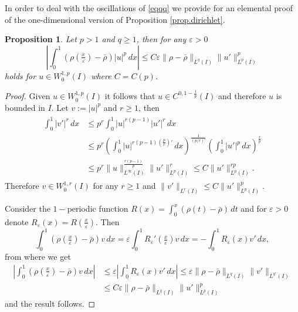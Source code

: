 \documentclass[12pt]{amsart}
\newtheorem{prop}[thm]{Proposition}
\theoremstyle{definition}
\theoremstyle{remark}
\numberwithin{equation}{section}
\begin{document}
 

In order to deal with the oscillations of \eqref{eqqq} we provide for an elemental proof of the one-dimensional version of Proposition \ref{prop.dirichlet}.

\begin{prop} \label{prop1d}
Let $p>1$ and $q\geq 1$, then for any $\varepsilon>0$ 
$$
\left|\int_0^1 (\rho(\tfrac{x}{\varepsilon})-\bar\rho) |u|^p\,dx \right| \leq C \varepsilon \|\rho-\bar \rho\|_{L^q(I)} \|u'\|_{L^{p}(I)}^p
$$
holds for $u\in W^{1,p}_0(I)$ where $C=C(p)$.
\end{prop}

\begin{proof}
Given $u\in W^{1,p}_0(I)$ it follows that $u\in C^{0,1-\frac1p}(I)$ and therefore $u$ is bounded in $I$. Let $v:=|u|^p$ and  $r\geq 1$, then
\begin{align*} 
\begin{split}
\int_0^1 |v'|^r\,dx &\leq p^r \int_0^1 |u|^{r(p-1)} |u'|^r\,dx\\
&\leq p^r \left(\int_0^1 |u|^{r(p-1)(\frac{p}{r})' }\,dx \right)^{\frac{1}{(p/r)'}} \left(\int_0^1 |u'|^p\,dx \right)^\frac{r}{p}\\
&\leq p^r \|u\|_{L^\infty(I)}^\frac{r(p-1)}{p} \|u'\|_{L^p(I)}^r \leq C \|u'\|_{L^p(I)}^{rp}.
\end{split}
\end{align*}
Therefore $v\in W^{1,r}_0(I)$ for any $r\geq 1$ and $\|v'\|_{L^r(I)}\leq C \|u'\|_{L^p(I)}^p$.

Consider the $1-$periodic function $R(x)=\int_0^x (\rho(t)-\bar \rho)\,dt$ and for $\varepsilon>0$ denote $R_\varepsilon(x)=R(\tfrac{x}{\varepsilon})$. Then
$$
\int_0^1 (\rho(\tfrac{x}{\varepsilon})-\bar\rho) v\,dx = \varepsilon \int_0^1 R_\varepsilon'(\tfrac{x}{\varepsilon})v\,dx = - \int_0^1 R_\varepsilon(x)v'\,dx,
$$
from where we get
\begin{align*}
\left|\int_0^1 (\rho(\tfrac{x}{\varepsilon})-\bar\rho) v\,dx \right| &\leq  \varepsilon \left| \int_0^1 R_\varepsilon(x) v'\,dx\right| \leq \varepsilon \|\rho-\bar \rho\|_{L^q(I)} \|v'\|_{L^{q'}(I)} \\
&\leq C \varepsilon \|\rho-\bar \rho\|_{L^q(I)} \|u'\|_{L^{p}(I)}^p
\end{align*}
and the result follows.
\end{proof}
\end{document}
